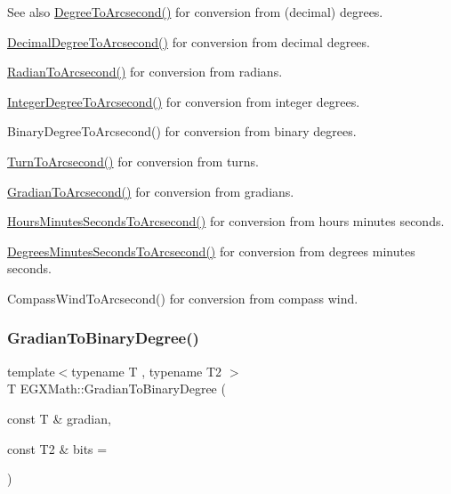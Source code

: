\begin{DoxySeeAlso}{See also}
\mbox{\hyperlink{group___e_g_x_math-_angle_conversions-_degree_gaf85e2d765c248f447854a807a68a5de8}{Degree\+To\+Arcsecond()}} for conversion from (decimal) degrees. 

\mbox{\hyperlink{group___e_g_x_math-_angle_conversions-_decimal_degree_gab9d5635a6e35127b5245978aba508962}{Decimal\+Degree\+To\+Arcsecond()}} for conversion from decimal degrees. 

\mbox{\hyperlink{group___e_g_x_math-_angle_conversions-_radian_ga2f952f6675a0fc54bf72bfe4e3d2664a}{Radian\+To\+Arcsecond()}} for conversion from radians. 

\mbox{\hyperlink{group___e_g_x_math-_angle_conversions-_integer_degree_gaa04058a2fea3dc3678264a05fac6e1ae}{Integer\+Degree\+To\+Arcsecond()}} for conversion from integer degrees. 

Binary\+Degree\+To\+Arcsecond() for conversion from binary degrees. 

\mbox{\hyperlink{group___e_g_x_math-_angle_conversions-_turn_gaad072969abc59ef6f5b63ac6a176a11b}{Turn\+To\+Arcsecond()}} for conversion from turns. 

\mbox{\hyperlink{group___e_g_x_math-_angle_conversions-_gradian_gac768fd444195264165d332f2f5e84d92}{Gradian\+To\+Arcsecond()}} for conversion from gradians. 

\mbox{\hyperlink{group___e_g_x_math-_angle_conversions-_hours_minutes_seconds_ga14620899c81c1f5e65cde96ef4ee626e}{Hours\+Minutes\+Seconds\+To\+Arcsecond()}} for conversion from hours minutes seconds. 

\mbox{\hyperlink{group___e_g_x_math-_angle_conversions-_degrees_minutes_seconds_gabebc8a012be0442c12409a2a71661ed4}{Degrees\+Minutes\+Seconds\+To\+Arcsecond()}} for conversion from degrees minutes seconds. 

Compass\+Wind\+To\+Arcsecond() for conversion from compass wind. 
\end{DoxySeeAlso}
\mbox{\label{group___e_g_x_math-_angle_conversions-_gradian_ga6bf31920148bfd61f1f06eb961c3f62b}} 
\subsubsection{\texorpdfstring{Gradian\+To\+Binary\+Degree()}{GradianToBinaryDegree()}}
{\footnotesize\ttfamily template$<$typename T , typename T2 $>$ \\
T E\+G\+X\+Math\+::\+Gradian\+To\+Binary\+Degree (\begin{DoxyParamCaption}\item[{const T \&}]{gradian,  }\item[{const T2 \&}]{bits = {} }\end{DoxyParamCaption})}




